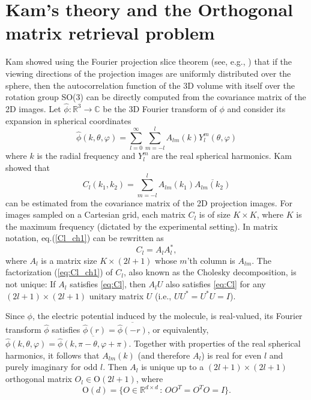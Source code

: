 \section{Kam's theory and the Orthogonal matrix retrieval problem}
Kam showed \cite{kam1980} using the Fourier projection slice theorem (see, e.g., \cite[p. 11]{Natr2001a}) that if the viewing
directions of the projection images are uniformly distributed over the sphere, then the
autocorrelation function of the 3D volume with itself over the rotation group
SO(3) can be directly computed from the
covariance matrix of the 2D images. Let $\hat \phi : \mathbb{R}^3 \to \mathbb{C}$ be the 3D Fourier
transform of $\phi$ and consider its expansion in spherical coordinates 
\begin{equation}
\hat{\phi}(k,\theta,\varphi) = \sum_{l=0}^{\infty} \sum_{m=-l}^{l} A_{lm}(k) Y_l^m
(\theta, \varphi)
\end{equation}
where $k$ is the radial frequency and $Y_l^m$ are the real spherical
harmonics. Kam showed that   
\begin{equation}
\label{Cl_ch1}
C_l(k_1,k_2) = \sum_{m=-l}^l A_{lm}(k_1)\overline{A_{lm}(k_2)}  
\end{equation}
can be estimated from the covariance matrix of the 2D projection images. For images sampled on a Cartesian grid, each matrix $C_l$ is of size $K\times K$, where $K$ is the maximum frequency (dictated by the experimental setting). In matrix notation, eq.(\ref{Cl_ch1}) can be rewritten as
\begin{equation}
C_l=A_l A_l^*, \label{eq:Cl_ch1}
\end{equation}
where $A_l$ is a matrix size
$K \times (2l+1)$ whose $m$'th column is $A_{lm}$. 
The factorization (\ref{eq:Cl_ch1}) of $C_l$, also known as the Cholesky decomposition, is not unique: If
$A_l$ satisfies \eqref{eq:Cl}, then $A_lU$ also satisfies \eqref{eq:Cl} for any $(2l+1) \times (2l+1)$ unitary matrix
$U$ (i.e., $UU^* = U^*U = I$). 

Since $\phi$, the electric potential induced by the molecule, is
real-valued, its Fourier transform $\hat{\phi}$ satisfies
$\hat{\phi}(r)=\overline{\hat{\phi}(-r)}$, or equivalently,
$\hat{\phi}(k,\theta,\varphi)=\overline{\hat{\phi}(k,\pi-\theta,\varphi+\pi)}$.
Together with properties of the real spherical harmonics, it follows that
$A_{lm}(k)$ (and therefore $A_l$) is real for even
$l$ and purely imaginary for odd $l$. Then $A_l$ is unique up to a
$(2l+1)\times (2l+1)$ orthogonal matrix $O_l\in \text{O}(2l+1)$, where 
\begin{equation}
\text{O}(d)=\{O\in \mathbb{R}^{d\times d} \,:\, OO^T=O^TO=I \}.
\end{equation}

